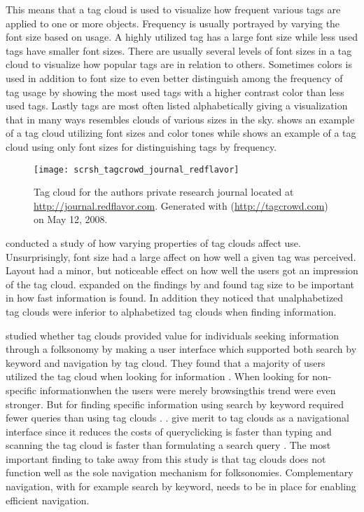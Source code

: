 This means that a tag cloud is used to visualize how frequent various tags
are applied to one or more objects. Frequency is usually portrayed by varying
the font size based on usage. A highly utilized tag has a large font size
while less used tags have smaller font sizes. There are usually several levels
of font sizes in a tag cloud to visualize how popular tags are in relation to
others. Sometimes colors is used in addition to font size to even better
distinguish among the frequency of tag usage by showing the most used tags
with a higher contrast color than less used tags. Lastly tags are most often
listed alphabetically giving a visualization that in many ways resembles
clouds of various sizes in the sky.
shows an example of a tag cloud utilizing font sizes and color tones while
 shows an example of a tag cloud using
only font sizes for distinguishing tags by frequency.

\begin{figure}
  \texttt{[image: scrsh\_tagcrowd\_journal\_redflavor]}
  \caption[Research Journal Tag Cloud]{
    Tag cloud for the authors private research journal located
    at \url{http://journal.redflavor.com}. Generated with
     (\url{http://tagcrowd.com}) on May 12, 2008.
  }
  \label{figure:scrsh.tagcrowd.journal.redflavor}
\end{figure}

\citet[]{rivadeneira07}
conducted a study of how varying properties of tag clouds affect
use. Unsurprisingly, font size had a large affect on how well a
given tag was perceived. Layout had a minor, but noticeable effect on
how well the users got an impression of the tag cloud.
\citet[]{halvey07} expanded on the findings by
\citeauthor{rivadeneira07} and found tag size to be important in how
fast information is found. In addition they noticed that unalphabetized
tag clouds were inferior to alphabetized tag clouds when finding information.

\citet[]{sinclair08} studied whether tag clouds provided
value for individuals seeking information through a folksonomy by making a
user interface which supported both search by keyword and navigation by tag
cloud. They found that a majority of users utilized the
tag cloud when looking for information \citeyearpar[]{sinclair08}.
When looking for non-specific information\dash{}when the users were merely
browsing\dash{}this trend were even stronger. But for finding specific
information using  search by keyword required fewer queries than using tag
clouds \citeyearpar[]{sinclair08}. \citeauthor{sinclair08}.
give merit to tag clouds as a navigational interface since it
reduces the costs of query\dash{}clicking is faster than typing and scanning
the tag cloud is faster than formulating a search query
\citeyearpar[]{sinclair08}. The most important finding to take away from
this study is that tag clouds does not function well as the sole navigation
mechanism for folksonomies. Complementary navigation, with for example search
by keyword, needs to be in place for enabling efficient navigation.

